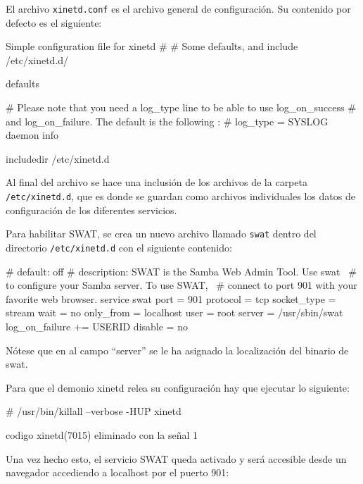 El archivo \texttt{xinetd.conf} es el archivo general de configuración. Su contenido por defecto es el siguiente:

\begin{listing}
  Simple configuration file for xinetd
#
# Some defaults, and include /etc/xinetd.d/

defaults
{

# Please note that you need a log_type line to be able to use log_on_success
# and log_on_failure. The default is the following :
# log_type = SYSLOG daemon info

}

includedir /etc/xinetd.d
\end{listing}

Al final del archivo se hace una inclusión de los archivos de la carpeta \texttt{/etc/xinetd.d}, que es donde se guardan como archivos individuales los datos de configuración de los diferentes servicios.

Para habilitar SWAT,  se crea un nuevo archivo llamado \texttt{swat} dentro del directorio \texttt{/etc/xinetd.d} con el siguiente contenido:

\begin{listing}
# default: off
# description: SWAT is the Samba Web Admin Tool. Use swat \
#              to configure your Samba server. To use SWAT, \
#              connect to port 901 with your favorite web browser.
service swat
{
	port    = 901
	protocol = tcp
	socket_type     = stream
	wait    = no
	only_from = localhost
	user    = root
	server  = /usr/sbin/swat
	log_on_failure  += USERID
	disable = no
}
\end{listing}

Nótese que en al campo ``server'' se le ha asignado la localización del binario de swat.


Para que el demonio xinetd relea su configuración hay que ejecutar lo siguiente:

\begin{listing}[style=consola, numbers=none]
# /usr/bin/killall --verbose -HUP xinetd
\end{listing}

\begin{SaveVerbatim}{codigo}
xinetd(7015) eliminado con la señal 1
\end{SaveVerbatim}

Una vez hecho esto, el servicio SWAT queda activado y será accesible desde un navegador accediendo a localhost por el puerto 901:

